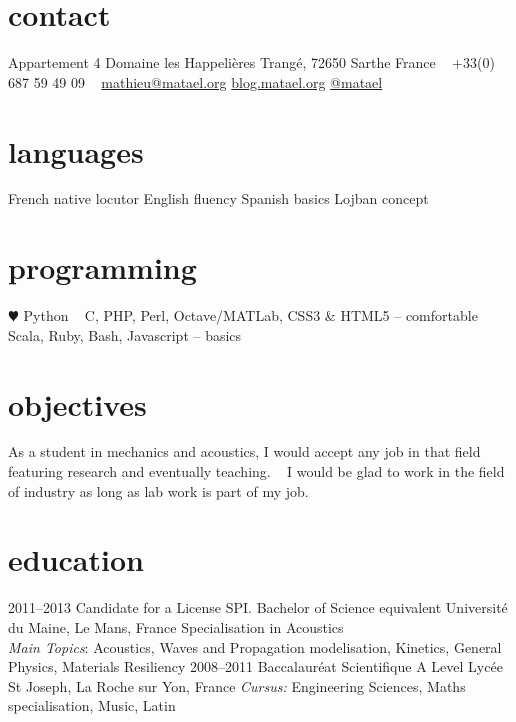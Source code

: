 \documentclass[]{friggeri-cv} %
\begin{document}


\begin{aside} %
\section{contact}
Appartement 4
Domaine les Happelières
Trangé, 72650 Sarthe
France
~
+33(0) 687 59 49 09
~
\href{mailto:mathieu@matael.org}{mathieu@matael.org}
\href{http://blog.matael.org}{blog.matael.org}
\href{http://twitter.com/matael}{@matael}
\section{languages}
French native locutor
English fluency
Spanish basics
Lojban concept
\section{programming}
{\color{red} $\varheartsuit$} Python
~
C, PHP, Perl, Octave/MATLab, CSS3 \& HTML5 -- comfortable
~
Scala, Ruby, Bash, Javascript -- basics
\section{objectives}
As a student in mechanics and acoustics, I would accept any job in that field featuring research and eventually
teaching.
~
I would be glad to work in the field of industry as long as lab work is part of my job.
\end{aside}



\section{education}

\begin{entrylist}
\entry
{2011--2013}
{{\normalfont Candidate for a License SPI.} Bachelor of Science {\normalfont equivalent}}
{Université du Maine, Le Mans, France}
{Specialisation in Acoustics \\\emph{Main Topics}: Acoustics, Waves and Propagation
modelisation, Kinetics, General Physics, Materials Resiliency}
\entry
{2008--2011}
{{\normalfont Baccalauréat Scientifique} A Level} 
{Lycée St Joseph, La Roche sur Yon, France}
{\emph{Cursus:} Engineering Sciences, Maths specialisation, Music, Latin}
\end{entrylist}
\end{document}
